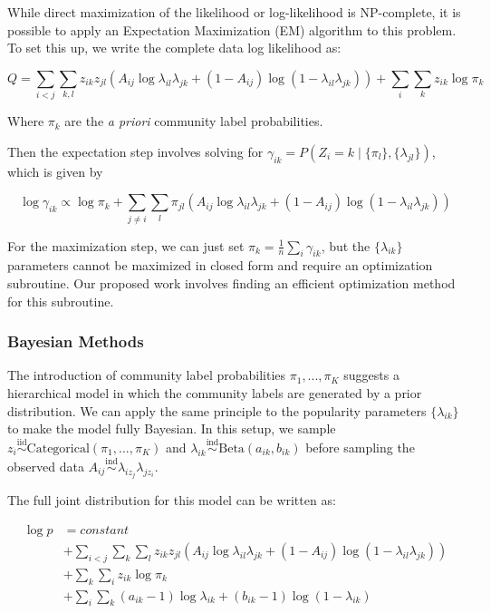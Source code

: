 \documentclass[
  11pt,
]{article}
\begin{document}
While direct maximization of the likelihood or log-likelihood is
NP-complete, it is possible to apply an Expectation Maximization (EM)
algorithm to this problem. To set this up, we write the complete data
log likelihood as:

\[Q = 
\sum_{i < j} \sum_{k, l} z_{ik} z_{jl} (A_{ij} \log \lambda_{il} \lambda_{jk} +
(1 - A_{ij}) \log(1 - \lambda_{il} \lambda_{jk}))
+ \sum_i \sum_k z_{ik} \log \pi_k\]

Where \(\pi_k\) are the \emph{a priori} community label probabilities.

Then the expectation step involves solving for
\(\gamma_{ik} = P(Z_i = k \mid \{\pi_l\}, \{\lambda_{jl}\})\), which is
given by

\[\log \gamma_{ik} \propto 
\log \pi_k + 
\sum_{j \neq i} \sum_l \pi_{jl} (A_{ij} \log \lambda_{il} \lambda_{jk} + 
(1 - A_{ij}) \log(1 - \lambda_{il} \lambda_{jk}))\]

For the maximization step, we can just set
\(\pi_k = \frac{1}{n} \sum_i \gamma_{ik}\), but the \(\{\lambda_{ik}\}\)
parameters cannot be maximized in closed form and require an
optimization subroutine. Our proposed work involves finding an efficient
optimization method for this subroutine.

\hypertarget{bayesian-methods}{%
\subsubsection{Bayesian Methods}\label{bayesian-methods}}

The introduction of community label probabilities \(\pi_1, ..., \pi_K\)
suggests a hierarchical model in which the community labels are
generated by a prior distribution. We can apply the same principle to
the popularity parameters \(\{\lambda_{ik}\}\) to make the model fully
Bayesian. In this setup, we sample
\(z_i \stackrel{\text{iid}}{\sim}\text{Categorical}(\pi_1, ..., \pi_K)\)
and
\(\lambda_{ik} \stackrel{\text{ind}}{\sim}\text{Beta}(a_{ik}, b_{ik})\)
before sampling the observed data
\(A_{ij} \stackrel{\text{ind}}{\sim}\lambda_{i z_j} \lambda_{j z_i}\).

The full joint distribution for this model can be written as:

\[\begin{split}
\log p & = constant \\
& + \sum_{i < j} \sum_k \sum_l z_{ik} z_{jl} 
(A_{ij} \log \lambda_{il} \lambda_{jk} + 
(1 - A_{ij}) \log (1 - \lambda_{il} \lambda_{jk})) \\
& + \sum_k \sum_i z_{ik} \log \pi_k \\
& + \sum_i \sum_k (a_{ik} - 1) \log \lambda_{ik} + (b_{ik} - 1) \log (1 - \lambda_{ik})
\end{split}\]
\end{document}
